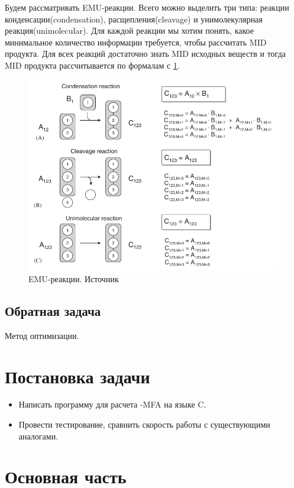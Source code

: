 \documentclass[a4paper, 12pt, left=30mm, right=15mm, top=20mm, bottom=20mm]{report}
\newcommand{\CC}{C\nolinebreak\hspace{-.05em}\raisebox{.4ex}{\tiny\bf +}\nolinebreak\hspace{-.10em}\raisebox{.4ex}{\tiny\bf +}}
\def\CC{{C\nolinebreak[4]\hspace{-.05em}\raisebox{.4ex}{\tiny\bf ++}}} %
\begin{document}
Будем рассматривать EMU-реакции. Всего можно выделить три типа: реакции конденсации(condensation), расщепления(cleavage) и унимолекулярная реакция(unimolecular). Для каждой реакции мы хотим понять, какое минимальное количество информации требуется, чтобы рассчитать MID продукта. Для всех реакций достаточно знать MID исходных веществ и тогда MID продукта рассчитывается по формалам с \ref{emu_reactions}.

\begin{figure}[t]
	\centering
	\includegraphics[width=1\textwidth]{emu_fig_1.png}
	\caption{EMU-реакции. Источник\cite{EMU_2007}}
	\label{emu_reactions}
\end{figure}

\section{Обратная задача}
Метод оптимизации.

\chapter{Постановка задачи}
\begin{itemize}
	\item Написать программу для расчета -MFA на языке \CC.
	\item Провести тестирование, сравнить скорость работы с существующими аналогами.
\end{itemize}

\chapter{Основная часть}
\end{document}
